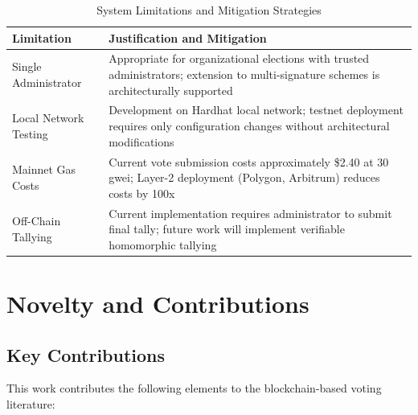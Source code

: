 \documentclass[conference]{IEEEtran}
\begin{document}
\begin{table}[htbp]
\caption{System Limitations and Mitigation Strategies}
\centering
\begin{tabular}{|p{2.5cm}|p{5cm}|}
\hline
\textbf{Limitation} & \textbf{Justification and Mitigation} \\
\hline
Single Administrator & Appropriate for organizational elections with trusted administrators; extension to multi-signature schemes is architecturally supported \\
\hline
Local Network Testing & Development on Hardhat local network; testnet deployment requires only configuration changes without architectural modifications \\
\hline
Mainnet Gas Costs & Current vote submission costs approximately \$2.40 at 30 gwei; Layer-2 deployment (Polygon, Arbitrum) reduces costs by 100x \\
\hline
Off-Chain Tallying & Current implementation requires administrator to submit final tally; future work will implement verifiable homomorphic tallying \\
\hline
\end{tabular}
\label{tab:limitations}
\end{table}

\section{Novelty and Contributions}

\subsection{Key Contributions}

This work contributes the following elements to the blockchain-based voting literature:
\end{document}

